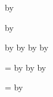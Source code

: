\newcount\CollaboratorI
{}
\advance\CollaboratorCitations by \CollaboratorI

\newcount\CollaboratorJ
{}
\advance\CollaboratorCitations by \CollaboratorJ



\newcount\TotalCitations
{}

\advance\TotalCitations by \FirstAuthorCitations
\advance\TotalCitations by \StudentAuthorCitations
\advance\TotalCitations by \CoauthorCitations
\advance\TotalCitations by \CollaboratorCitations


\newcount\FirstAuthorPublications
{}

\newcount\StudentPublications
{}

\newcount\CoauthorPublications
{}

\newcount\CollaborativePublications
{}

\newcount\AllPublications
\AllPublications=\FirstAuthorPublications
\advance\AllPublications by \StudentPublications
\advance\AllPublications by \CoauthorPublications
\advance\AllPublications by \CollaborativePublications

\newcount\AllCollaborativePublications
\AllCollaborativePublications=\CoauthorPublications
\advance\AllCollaborativePublications by \CollaborativePublications
